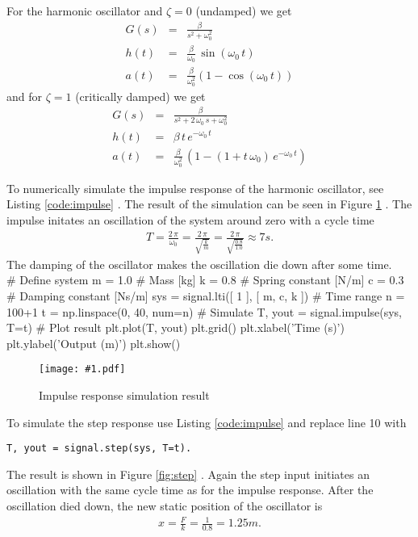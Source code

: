 \documentclass[a4paper,12pt]{article}
\newcommand{\Fig}[3]{%
	\begin{figure}[htb]%
	\begin{center}%
	\texttt{[image: \#1.pdf]}%
	\end{center}%
	\caption{#3\label{fig:#1}}%
	\end{figure}%
	}
\newcommand{\FigRef}[1]{%
	Figure \ref{fig:#1}%
	}
\newcommand*{\CodeLabel}{}
\newcommand*{\CodeCaption}{}
\newenvironment{code}[4]%
	{\renewcommand*{\CodeLabel}{#2}\renewcommand*{\CodeCaption}{#3}\codefloat\hrulefill\minted[#4]{#1}}
	{\endminted\caption{\CodeCaption\label{code:\CodeLabel}}\hrulefill\endcodefloat}
\newcommand{\CodeRef}[1]{%
	Listing \ref{code:#1}%
	}
\begin{document}
For the harmonic oscillator and $\zeta=0$ (undamped) we get
\begin{eqnarray}
G(s)&=&\frac{\beta}{s^2+\omega_0^2}\\
h(t)&=&\frac{\beta}{\omega_0}\,\sin(\omega_0\,t)\\
a(t)&=&\frac{\beta}{\omega_0^2}\left(1-\cos(\omega_0\,t)\right)
\end{eqnarray}
and for $\zeta=1$ (critically damped) we get
\begin{eqnarray}
G(s)&=&\frac{\beta}{s^2+2\,\omega_0\,s+\omega_0^2}\\
h(t)&=&\beta\,t\,e^{-\omega_0\,t}\\
a(t)&=&\frac{\beta}{\omega_0^2}\,\left(1-\left(1+t\,\omega_0\right)\,e^{-\omega_0\,t}\right)
\end{eqnarray}

To numerically simulate the impulse response of the harmonic oscillator, see
\CodeRef{impulse}. The result of the simulation can be seen in \FigRef{impulse}.
The impulse initates an oscillation of the system around zero with a cycle time
\begin{eqnarray}
T=\frac{2\,\pi}{\omega_0}=\frac{2\,\pi}{\sqrt{\frac{k}{m}}}=\frac{2\,\pi}{\sqrt{\frac{0.8}{1.0}}}\approx 7\unit{s}.
\end{eqnarray}
The damping of the oscillator makes the oscillation die down after some time.\\

\begin{code}{python}{impulse}{Simulate the impulse response of a system}{linenos}
# Define system
m = 1.0 # Mass [kg]
k = 0.8 # Spring constant [N/m]
c = 0.3 # Damping constant [Ns/m]
sys = signal.lti([ 1 ], [ m, c, k ])
# Time range
n = 100+1
t = np.linspace(0, 40, num=n)
# Simulate
T, yout = signal.impulse(sys, T=t)
# Plot result
plt.plot(T, yout)
plt.grid()
plt.xlabel('Time (s)')
plt.ylabel('Output (m)')
plt.show()
\end{code}

\Fig{impulse}{0.7}{Impulse response simulation result}

To simulate the step response use \CodeRef{impulse} and replace line 10 with
\begin{verbatim}
T, yout = signal.step(sys, T=t).
\end{verbatim}
The result is shown in \FigRef{step}. Again the step input initiates an
oscillation with the same cycle time as for the impulse response. After the
oscillation died down, the new static position of the oscillator is
\begin{eqnarray}
x=\frac{F}{k}=\frac{1}{0.8}=1.25\unit{m}.
\end{eqnarray}
\end{document}
